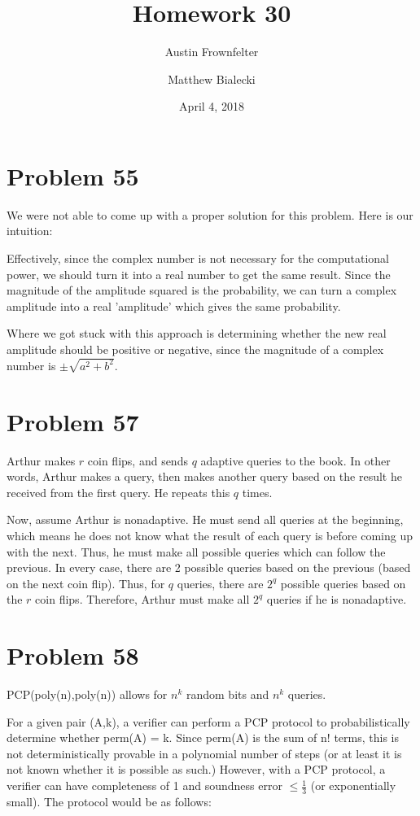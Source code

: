 \documentclass{article}
\title{Homework 30}
\author{Austin Frownfelter \and Matthew Bialecki}
\date{April 4, 2018}
\begin{document}
\maketitle

\section{Problem 55}
We were not able to come up with a proper solution for this problem.  Here is our intuition:

Effectively, since the complex number is not necessary for the computational power, we should turn it into a real number to get the same result.  Since the magnitude of the amplitude squared is the probability, we can turn a complex amplitude into a real 'amplitude' which gives the same probability.  

Where we got stuck with this approach is determining whether the new real amplitude should be positive or negative, since the magnitude of a complex number is $\pm \sqrt{a^2+b^2}.$

\section{Problem 57}
Arthur makes $r$ coin flips, and sends $q$ adaptive queries to the book.  In other words, Arthur makes a query, then makes another query based on the result he received from the first query.  He repeats this $q$ times.

Now, assume Arthur is nonadaptive.  He must send all queries at the beginning, which means he does not know what the result of each query is before coming up with the next.  Thus, he must make all possible queries which can follow the previous.  In every case, there are 2 possible queries based on the previous (based on the next coin flip).  Thus, for $q$ queries, there are $2^q$ possible queries based on the $r$ coin flips.  Therefore, Arthur must make all $2^q$ queries if he is nonadaptive.

\section{Problem 58}



PCP(poly(n),poly(n)) allows for $n^k$ random bits and $n^k$ queries.

For a given pair (A,k), a verifier can perform a PCP protocol to probabilistically determine whether perm(A) = k.  Since perm(A) is the sum of n! terms, this is not deterministically provable in a polynomial number of steps (or at least it is not known whether it is possible as such.)  However, with a PCP protocol, a verifier can have completeness of 1 and soundness error $\leq \frac13$ (or exponentially small).  The protocol would be as follows:
\end{document}
